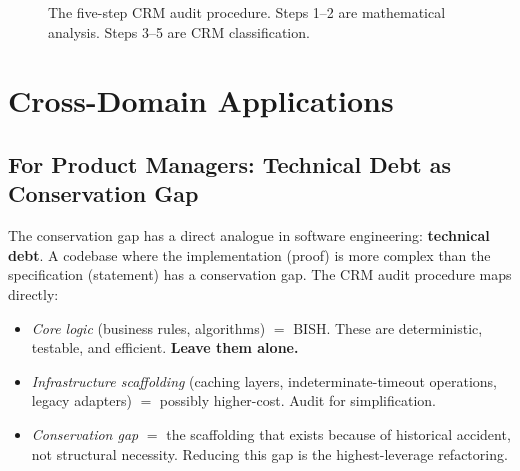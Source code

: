 \documentclass[11pt,twoside,openany]{report}
\theoremstyle{remark}
\newcommand{\BISH}{\textsf{BISH}}
\newcommand{\CLASS}{\textsf{CLASS}}
\begin{document}
\begin{figure}[htbp]
\centering
{}
\caption{The five-step CRM audit procedure. Steps 1--2 are mathematical analysis. Steps 3--5 are CRM classification.}
\label{fig:audit-steps}
\end{figure}


\section{Cross-Domain Applications}

\subsection*{For Product Managers: Technical Debt as Conservation Gap}

The conservation gap has a direct analogue in software engineering: \textbf{technical debt}. A codebase where the implementation (proof) is more complex than the specification (statement) has a conservation gap. The CRM audit procedure maps directly:

\begin{itemize}
  \item \emph{Core logic} (business rules, algorithms) $=$ \BISH. These are deterministic, testable, and efficient. \textbf{Leave them alone.}
  \item \emph{Infrastructure scaffolding} (caching layers, indeterminate-timeout operations, legacy adapters) $=$ possibly higher-cost. Audit for simplification.
  \item \emph{Conservation gap} $=$ the scaffolding that exists because of historical accident, not structural necessity. Reducing this gap is the highest-leverage refactoring.
\end{itemize}
\end{document}
